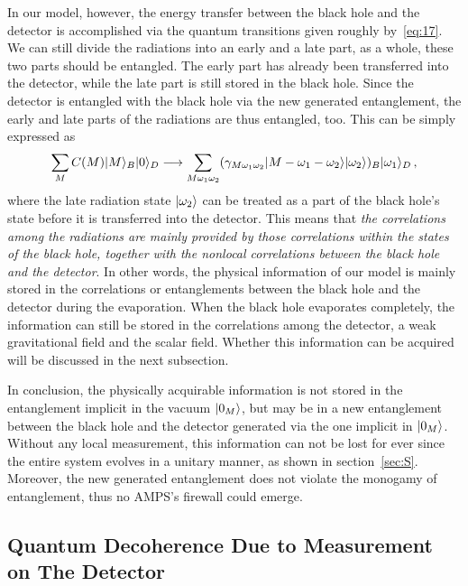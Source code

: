 \documentclass[12pt,a4paper]{article}
\begin{document}
In our model, however, the energy transfer between the black hole and the detector is accomplished via the quantum transitions given roughly by~\eqref{eq:17}. We can still divide the radiations into an early and a late part, as a whole, these two parts should be
entangled. The early part has already been transferred into the detector,
while the late part is still stored in the black hole. Since the
detector is entangled with the black hole via the new generated
entanglement, the early and late parts of the radiations are thus
entangled, too. This can be simply expressed as
\begin{equation}
\label{eq:47a}
\begin{split}
\sum_{M}C(M)\arrowvert
M\rangle_B\arrowvert0\rangle_D\longrightarrow\sum_{M\omega_1\omega_2}(\gamma_{M\omega_1\omega_2}\arrowvert
M-\omega_1-\omega_2\rangle\arrowvert\omega_2\rangle)_B\arrowvert\omega_1\rangle_D \,,
\end{split}
\end{equation}
where the late radiation state $\arrowvert\omega_2\rangle$ can be treated
as a part of the black hole's state before it is transferred into the
detector. This means that \emph{the correlations among the radiations are mainly provided by those correlations within the states of the black
hole, together with the nonlocal correlations between the black hole and the detector}. In other words, the physical information of our model is mainly stored in the correlations or entanglements between the black hole and the detector during the evaporation. When the black hole evaporates completely, the information can still be stored in the correlations among the detector, a weak gravitational field and the scalar field. Whether this information can be acquired will be discussed in the next subsection.

In conclusion, the physically acquirable information is not stored in
the entanglement implicit in the vacuum $\arrowvert0_M\rangle$, but may be in
a new entanglement between the black hole and the detector generated
via the one implicit in $\arrowvert0_M\rangle$. Without
any local measurement, this information can not be lost for ever since the entire system evolves in a unitary manner, as shown in section~\ref{sec:S}.
Moreover, the new generated entanglement does not violate the monogamy of
entanglement, thus no AMPS's firewall could emerge.

\subsection{Quantum Decoherence Due to Measurement on The Detector}
\label{sec:mix}
\end{document}
